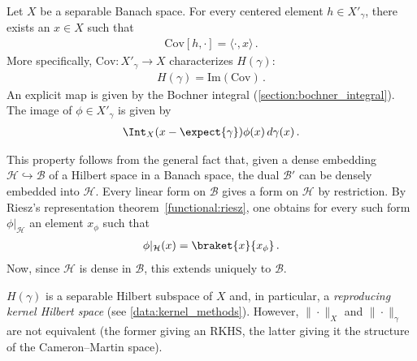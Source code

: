     \begin{property}\label{stoch:cameron_martin_characterization}
        Let $X$ be a separable Banach space. For every centered element $h\in X'_\gamma$, there exists an $x\in X$ such that
        \begin{gather}
            \mathrm{Cov}[h,\cdot] = \langle\cdot,x\rangle\,.
        \end{gather}
        More specifically, $\mathrm{Cov}:X'_\gamma\rightarrow X$ characterizes $H(\gamma)$:
        \begin{gather}
            H(\gamma) = \mathrm{Im}(\mathrm{Cov})\,.
        \end{gather}
        An explicit map is given by the Bochner integral (\cref{section:bochner_integral}). The image of $\phi\in X'_\gamma$ is given by
        \begin{gather}
            \Int_X(x-\expect{\gamma})\phi(x)\,d\gamma(x)\,.
        \end{gather}
    \end{property}
    \begin{remark}
        This property follows from the general fact that, given a dense embedding $\mathcal{H}\hookrightarrow\mathcal{B}$ of a Hilbert space in a Banach space, the dual $\mathcal{B}'$ can be densely embedded into $\mathcal{H}$. Every linear form on $\mathcal{B}$ gives a form on $\mathcal{H}$ by restriction. By Riesz's representation theorem~\ref{functional:riesz}, one obtains for every such form $\phi|_{\mathcal{H}}$ an element $x_\phi$ such that
        \begin{gather*}
            \phi|_{\mathcal{H}}(x) = \braket{x}{x_\phi}\,.
        \end{gather*}
        Now, since $\mathcal{H}$ is dense in $\mathcal{B}$, this extends uniquely to $\mathcal{B}$.
    \end{remark}

    \begin{property}
        $H(\gamma)$ is a separable Hilbert subspace of $X$ and, in particular, a \textit{reproducing kernel Hilbert space} (see \cref{data:kernel_methods}). However, $\|\cdot\|_X$ and $\|\cdot\|_\gamma$ are not equivalent (the former giving an RKHS, the latter giving it the structure of the Cameron--Martin space).
    \end{property}

